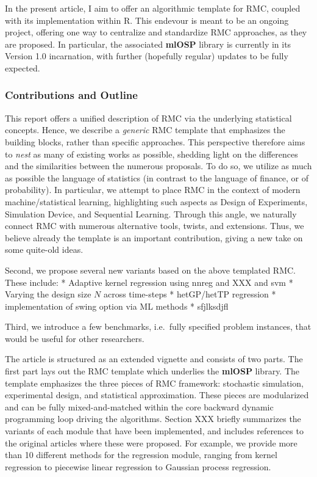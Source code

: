 \documentclass[]{article}
\begin{document}
In the present article, I aim to offer an algorithmic template for RMC,
coupled with its implementation within R. This endevour is meant to be
an ongoing project, offering one way to centralize and standardize RMC
approaches, as they are proposed. In particular, the associated
\textbf{mlOSP} library is currently in its Version 1.0 incarnation, with
further (hopefully regular) updates to be fully expected.

\subsubsection{Contributions and
Outline}\label{contributions-and-outline}

This report offers a unified description of RMC via the underlying
statistical concepts. Hence, we describe a \emph{generic} RMC template
that emphasizes the building blocks, rather than specific approaches.
This perspective therefore aims to \emph{nest} as many of existing works
as possible, shedding light on the differences and the similarities
between the numerous proposals. To do so, we utilize as much as possible
the language of statistics (in contrast to the language of finance, or
of probability). In particular, we attempt to place RMC in the context
of modern machine/statistical learning, highlighting such aspects as
Design of Experiments, Simulation Device, and Sequential Learning.
Through this angle, we naturally connect RMC with numerous alternative
tools, twists, and extensions. Thus, we believe already the template is
an important contribution, giving a new take on some quite-old ideas.

Second, we propose several new variants based on the above templated
RMC. These include: * Adaptive kernel regression using nnreg and XXX and
svm * Varying the design size \(N\) across time-steps * hetGP/hetTP
regression * implementation of swing option via ML methods * sfjlksdjfl

Third, we introduce a few benchmarks, i.e.~fully specified problem
instances, that would be useful for other researchers.

The article is structured as an extended vignette and consists of two
parts. The first part lays out the RMC template which underlies the
\textbf{mlOSP} library. The template emphasizes the three pieces of RMC
framework: stochastic simulation, experimental design, and statistical
approximation. These pieces are modularized and can be fully
mixed-and-matched within the core backward dynamic programming loop
driving the algorithms. Section XXX briefly summarizes the variants of
each module that have been implemented, and includes references to the
original articles where these were proposed. For example, we provide
more than 10 different methods for the regression module, ranging from
kernel regression to piecewise linear regression to Gaussian process
regression.
\end{document}
